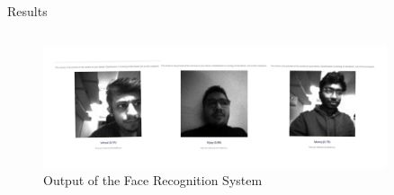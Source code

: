 \begin{frame}[allowframebreaks]{Results}
\begin{table}[h!]
\begin{tabular}{|p{3cm}|p{3cm}|}
	\end{tabular}
	\label{tab: Performance_Metrics}
\end{table}


	
\begin{figure}[h!]
	\centering
	\includegraphics[width=0.9\textwidth]{images/Result.jpg}
	\caption{Output of the Face Recognition System}
	\label{fig:Output}
\end{figure}




\end{frame}

